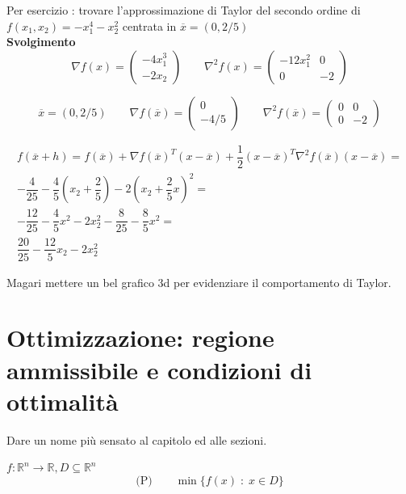 \begin{exercise}
Per esercizio :
trovare l'approssimazione di Taylor del secondo
ordine di
 $f(x_1,x_2) = - x_1^4 -x_2^2$ centrata in $\overline{x} = (0, 2/5)$
 \\
\textbf{Svolgimento}
$$
\nabla f(x) = 
\begin{pmatrix}
  -4 x_1^{3} \\
  -2 x_2
\end{pmatrix}
\qquad
\nabla^{2} f(x) = 
\begin{pmatrix}
  -12 x_1^{2} & 0 \\
  0 & -2
\end{pmatrix}
$$

$$
\overline{x} = (0, 2/5)
\qquad
\nabla f(\overline{x}) = 
\begin{pmatrix}
   0  \\
  -4/5
\end{pmatrix}
\qquad
\nabla^{2} f(\overline{x}) = 
\begin{pmatrix}
  0 & 0 \\
  0 & -2
\end{pmatrix}
$$

$$
\begin{array}{l}
f(\overline{x} +h) = f(\overline{x}) +
  \nabla f(\overline{x})^{T}(x- \overline{x})
  + \dfrac{1}{2}( x - \overline{x})^{T}
   \nabla^{2} f(\overline{x}) (x - \overline{x}) = \\
-\dfrac{4}{25} - \dfrac{4}{5} (x_2 + \dfrac{2}{5}) 
   - 2(x_2 + \dfrac{2}{5}x)^{2} = \\
-\dfrac{12}{25} -\dfrac{4}{5} x^{2} - 2x_2^{2} - 
   \dfrac{8}{25} - \dfrac{8}{5} x^{2} = \\
   \dfrac{20}{25} - \dfrac{12}{5} x_2 - 2x_2^{2} 
\end{array}
$$

\begin{todo}
 Magari mettere un bel grafico 3d per evidenziare
il comportamento di Taylor. 
\end{todo}
\end{exercise}

\chapter{Ottimizzazione: regione ammissibile e condizioni di ottimalità}
\label{chap:ottimizzazioni-definizioni}
\begin{todo}
Dare un nome pi\`u sensato al capitolo ed alle sezioni.
\end{todo}
$ f: \mathbb{R}^n \rightarrow \mathbb{R}, D \subseteq \mathbb{R}^n$\\
$$\text{(P)} \qquad
\min\{ f(x)\; : \; x \in D \}
$$

